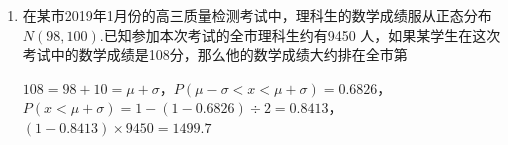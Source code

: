 \begin{enumerate}
        \item 在某市2019年1月份的高三质量检测考试中，理科生的数学成绩服从正态分布 $N(98,100)$.已知参加本次考试的全市理科生约有9450 人，如果某学生在这次考试中的数学成绩是108分，那么他的数学成绩大约排在全市第
        \begin{jieda}
            $108 = 98+10 = \mu + \sigma$，$P(\mu - \sigma < x < \mu + \sigma) = 0.6826$，$P(x < \mu + \sigma) = 1-(1-0.6826)\div 2 = 0.8413$，$(1-0.8413) \times 9450 = 1499.7$
        \end{jieda}
\end{enumerate}